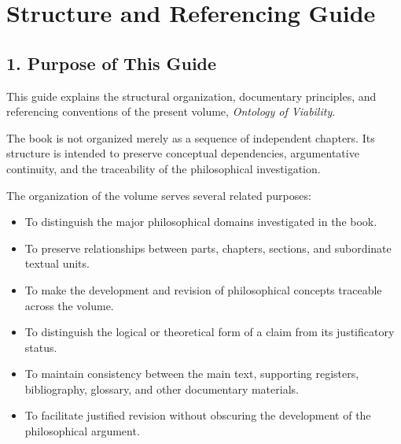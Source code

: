
\cleardoublepage

\chapter*{Structure and Referencing Guide}


\section*{1. Purpose of This Guide}

This guide explains the structural organization,
documentary principles, and referencing conventions
of the present volume, \textit{Ontology of Viability}.

The book is not organized merely as a sequence
of independent chapters. Its structure is intended
to preserve conceptual dependencies, argumentative
continuity, and the traceability of the philosophical
investigation.

The organization of the volume serves several
related purposes:

\begin{itemize}
    \item To distinguish the major philosophical domains
    investigated in the book.
    \item To preserve relationships between parts,
    chapters, sections, and subordinate textual units.
    \item To make the development and revision of
    philosophical concepts traceable across the volume.
    \item To distinguish the logical or theoretical
    form of a claim from its justificatory status.
    \item To maintain consistency between the main text,
    supporting registers, bibliography, glossary,
    and other documentary materials.
    \item To facilitate justified revision without
    obscuring the development of the philosophical
    argument.
\end{itemize}

